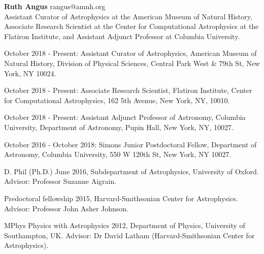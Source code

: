 \documentclass[12pt,letterpaper]{article}
\begin{document}
\thispagestyle{empty}\sloppy\sloppypar\raggedbottom

\textbf{\Large Ruth Angus} \hfill
\textsf{\small rangus@amnh.org} \\[0.5ex]
Assistant Curator of Astrophysics at the American Museum of Natural History,
Associate Research Scientist at the Center for Computational Astrophysics at
the Flatiron Institute,
and Assistant Adjunct Professor at Columbia University.
\\[0.5ex]

\begin{list}{}{\cvlist}
\item
    October 2018 - Present: Assistant Curator of Astrophysics, American Museum
    of Natural History, Division of Physical Sciences, Central Park West \&
    79th St, New York, NY 10024.
\item
    October 2018 - Present: Associate Research Scientist, Flatiron Institute,
    Center for Computational Astrophysics, 162 5th Avenue, New York, NY,
    10010.
\item
    October 2018 - Present: Assistant Adjunct Professor of Astronomy,
    Columbia University, Department of Astronomy, Pupin Hall, New York, NY,
    10027.
\item
    October 2016 - October 2018: Simons Junior Postdoctoral Fellow,
    Department of Astronomy, Columbia University, 550 W 120th St, New York,
    NY 10027.
\end{list}

\begin{list}{}{\cvlist}
\item
D. Phil (Ph.D.) June 2016, Subdepartment of Astrophysics, University of
Oxford.
Advisor: Professor Suzanne Aigrain.
\item
Predoctoral fellowship 2015, Harvard-Smithsonian Center for Astrophysics.
Advisor: Professor John Asher Johnson.
\item
MPhys Physics with Astrophysics 2012, Department of Physics, University of
Southampton, UK. Advisor: Dr David Latham (Harvard-Smithsonian Center for
Astrophysics).
\end{list}
\end{document}
